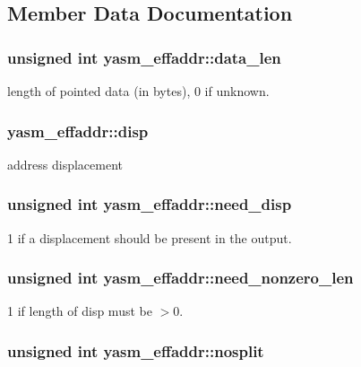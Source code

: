 \subsection{Member Data Documentation}
\hypertarget{structyasm__effaddr_a6e0ee976930fc59ad606672e7419c7da}{
\subsubsection[{data\-\_\-len}]{\setlength{\rightskip}{0pt plus 5cm}unsigned int yasm\-\_\-effaddr\-::data\-\_\-len}}\label{structyasm__effaddr_a6e0ee976930fc59ad606672e7419c7da}
length of pointed data (in bytes), 0 if unknown. \hypertarget{structyasm__effaddr_a56ca3771f045ae4a400c4d9256cb472c}{
\subsubsection[{disp}]{ yasm\-\_\-effaddr\-::disp}}\label{structyasm__effaddr_a56ca3771f045ae4a400c4d9256cb472c}
address displacement \hypertarget{structyasm__effaddr_af697fb5350c4730913e811afce1aa2dd}{
\subsubsection[{need\-\_\-disp}]{\setlength{\rightskip}{0pt plus 5cm}unsigned int yasm\-\_\-effaddr\-::need\-\_\-disp}}\label{structyasm__effaddr_af697fb5350c4730913e811afce1aa2dd}
1 if a displacement should be present in the output. \hypertarget{structyasm__effaddr_abd02ae0cd1f72be0d7291f179cc87660}{
\subsubsection[{need\-\_\-nonzero\-\_\-len}]{\setlength{\rightskip}{0pt plus 5cm}unsigned int yasm\-\_\-effaddr\-::need\-\_\-nonzero\-\_\-len}}\label{structyasm__effaddr_abd02ae0cd1f72be0d7291f179cc87660}
1 if length of disp must be $>$0. \hypertarget{structyasm__effaddr_a6d3e48f8750aeea38499f04415ec1918}{
\subsubsection[{nosplit}]{\setlength{\rightskip}{0pt plus 5cm}unsigned int yasm\-\_\-effaddr\-::nosplit}}\label{structyasm__effaddr_a6d3e48f8750aeea38499f04415ec1918}
